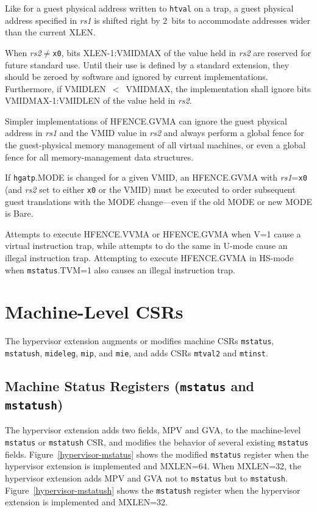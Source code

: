 \begin{commentary}
Like for a guest physical address written to {\tt htval} on a
trap, a guest physical address specified in {\em rs1} is shifted
right by 2~bits to accommodate addresses wider than the current XLEN.
\end{commentary}

When {\em rs2}$\neq${\tt x0}, bits XLEN-1:VMIDMAX of the value held in {\em
rs2} are reserved for future standard use.  Until their use is defined by a
standard extension, they should be zeroed by software and ignored
by current implementations.
Furthermore, if VMIDLEN~$<$~VMIDMAX, the implementation shall ignore bits
VMIDMAX-1:VMIDLEN of the value held in {\em rs2}.

\begin{commentary}
Simpler implementations of HFENCE.GVMA can ignore the guest physical address in
{\em rs1} and the VMID value in {\em rs2} and always perform a global fence for
the guest-physical memory management of all virtual machines, or even a global
fence for all memory-management data structures.
\end{commentary}

If {\tt hgatp}.MODE is changed for a given VMID, an HFENCE.GVMA with
{\em rs1}={\tt x0} (and {\em rs2} set to either {\tt x0} or the VMID) must
be executed to order subsequent guest translations with the MODE
change---even if the old MODE or new MODE is Bare.

Attempts to execute HFENCE.VVMA or HFENCE.GVMA when V=1 cause a virtual
instruction trap, while attempts to do the same in U-mode
cause an illegal instruction trap.
Attempting to execute HFENCE.GVMA in HS-mode when {\tt mstatus}.TVM=1
also causes an illegal instruction trap.

\section{Machine-Level CSRs}

The hypervisor extension augments or modifies machine CSRs {\tt mstatus},
{\tt mstatush}, {\tt mideleg}, {\tt mip}, and {\tt mie}, and
adds CSRs {\tt mtval2} and {\tt mtinst}.

\subsection{Machine Status Registers ({\tt mstatus} and {\tt mstatush})}

The hypervisor extension adds two fields, MPV and GVA, to the
machine-level {\tt mstatus} or {\tt mstatush} CSR, and modifies the
behavior of several existing {\tt mstatus} fields.
Figure~\ref{hypervisor-mstatus} shows the modified {\tt mstatus} register
when the hypervisor extension is implemented and MXLEN=64.
When MXLEN=32, the hypervisor extension adds MPV and GVA not to {\tt mstatus}
but to {\tt mstatush}.
Figure~\ref{hypervisor-mstatush} shows the {\tt mstatush} register when
the hypervisor extension is implemented and MXLEN=32.

